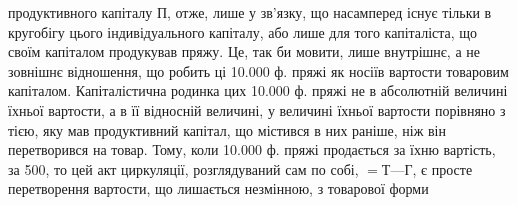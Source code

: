 продуктивного капіталу $П$, отже, лише у зв’язку, що насамперед існує
тільки в кругобігу цього індивідуального капіталу, або лише для того
капіталіста, що своїм капіталом продукував пряжу. Це, так би мовити,
лише внутрішнє, а не зовнішнє відношення, що робить ці 10.000 ф.
пряжі як носіїв вартости товаровим капіталом. Капіталістична родинка
цих 10.000 ф. пряжі не в абсолютній величині їхньої вартости, а в її відносній
величині, у величині їхньої вартости порівняно з тією, яку мав
продуктивний капітал, що містився в них раніше, ніж він перетворився
на товар. Тому, коли 10.000 ф. пряжі продається за їхню вартість, за
500, то цей акт циркуляції, розглядуваний сам по собі, $= Т — Г$,
є просте перетворення вартости, що лишається незмінною, з товарової форми
\parbreak{}  %
